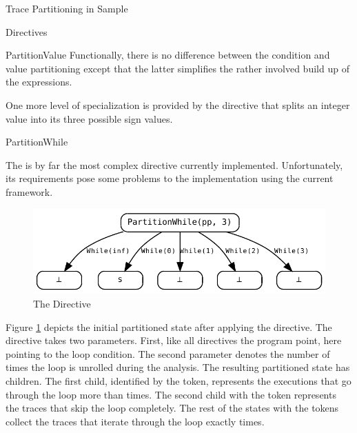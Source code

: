 \begin{chapter}{Trace Partitioning in Sample}
\begin{section}{Directives}
\begin{subsection}{PartitionValue}
			Functionally, there is no difference between the condition and value partitioning except that the latter simplifies the rather involved build up of the expressions.

			One more level of specialization is provided by the  directive that splits an integer value into its three possible sign values.
		\end{subsection}


		\begin{subsection}{PartitionWhile}
			\label{section:PartitionWhile}

			The  is by far the most complex directive currently implemented. Unfortunately, its requirements pose some problems to the implementation using the current framework.

			\begin{figure}
				\centering
				\includegraphics[]{Graphs/PartitionWhile.pdf}
				\caption{The  Directive}
				\label{figure:PartitionWhile}
			\end{figure}

			Figure \ref{figure:PartitionWhile} depicts the initial partitioned state after applying the directive. The directive takes two parameters. First, like all directives the program point, here pointing to the loop condition. The second parameter  denotes the number of times the loop is unrolled during the analysis. The resulting partitioned state has  children. The first child, identified by the  token, represents the executions that go through the loop more than  times. The second child with the token  represents the traces that skip the loop completely. The rest of the states with the tokens  collect the traces that iterate through the loop exactly  times.


\end{subsection}
\end{section}
\end{chapter}

